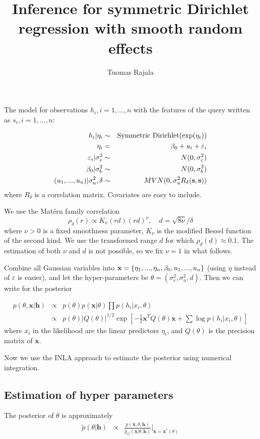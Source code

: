 \documentclass[10pt, onecolumn]{article}
\newcommand{\x}{\mathbf{x}}
\newcommand{\y}{\mathbf{h}}
\begin{document}
\title{Inference for symmetric Dirichlet regression with smooth random effects}
\author{Tuomas Rajala}
\maketitle

The model for observations $h_i, i=1,...,n$ with the features of the query written as $s_i, i=1, ..., n$:

\begin{eqnarray}
h_i | \eta_i & \sim & \mathrm{Symmetric\ Dirichlet}(\exp(\eta_i))\\
\eta_i &=& \beta_0 + u_i + \varepsilon_i \\
\varepsilon_i|\sigma_e^2  &\sim & N(0, \sigma^2_\varepsilon)\\
\beta_0|\sigma_b^2 &\sim & N(0, \sigma^2_b)\\
(u_1,...,u_n)|\sigma_u^2, \delta  &\sim & MVN(0, \sigma_u^2 R_{\delta}(\bold s, \bold s))
\end{eqnarray}
where $R_\delta$ is a correlation matrix. Covariates are easy to include.

We use the Mat\'{e}rn family correlation
\[
\rho_\delta (r) \propto K_\nu(r d) (r d)^\nu, \quad d=\sqrt{8\nu}/\delta
\]
where $\nu>0$ is a fixed smoothness parameter, $K_\nu$ is the modified Bessel function of the second kind. We use the transformed range $d$ for which $\rho_d(d)\approx 0.1$. The estimation of both $\nu$ and $d$ is not possible, so we fix $\nu=1$ in what follows.

Combine all Gaussian variables into $\bold x=\{\eta_1,...,\eta_n, \beta_0, u_1, ..., u_n\}$ (using $\eta$ instead of $\varepsilon$ is easier), and let the hyper-parameters be $\theta=(\sigma_e^2, \sigma_u^2, d)$. Then we can write for the posterior

\begin{eqnarray}
p(\theta, \x | \y ) &\propto& p(\theta)p(\x|\theta) \prod p(h_i|x_i, \theta)\\
&\propto&p(\theta)|Q(\theta)|^{1/2} \exp\left[-\frac{1}{2}\x^T Q(\theta)\x + \sum \log p(h_i|x_i,\theta)\right]
\end{eqnarray}
where $x_i$ in the likelihood are the linear predictors $\eta_i$, and $Q(\theta)$ is the precision matrix of $\x$. 

Now we use the INLA approach to estimate the posterior using numerical integration. 
\subsection{Estimation of hyper parameters}
The posterior of $\theta$ is approximately
\begin{eqnarray}
\tilde p(\theta|\y) &\propto & \frac{p(\x, \theta, \y)}{\tilde p_G(\x|\theta, \y)} \Big|_{\x=\x^*(\theta)}
\end{eqnarray}
 
\end{document}
